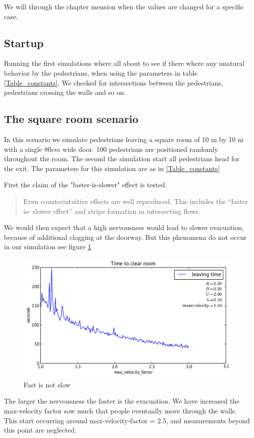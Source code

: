 We will through the chapter mension when the values are changed for a specific case. 

\subsection{Startup}
Running the first simulations where all about to see if there where any unatural behavior 
by the pedestrians, when using the parameters in table \ref{Table_constants}. We checked for intersections between the pedestrians, pedestrians crossing the walls and so on.





\subsection{The square room scenario}
In this scenario we simulate pedestrians leaving a square room of 10 m by 10 m with a single $80cm$ wide door. 100 pedestrians are positioned randomly throughout the room. The second the simulation start all pedestrians head for the exit. The parameters for this simulation are as in \ref{Table_constants}

First the claim of the "faster-is-slower" effect is tested.
\begin{quote}
Even counterintuitive
effects are well reproduced. This includes the “faster is-
slower effect” and stripe formation in intersecting flows. \cite{self-org}
\end{quote}
We would then expect that a high nervousness would lead to slower evacuation, because of additional clogging at the doorway. But this phenomena do not occur in our simulation see figure \ref{FastIsSlow}
\begin{figure}
\centering
\includegraphics[scale=0.5]{Figures/fastIsSlowNot}
\caption{Fast is not slow}
\label{FastIsSlow}
\end{figure}
The larger the nervousness the faster is the evacuation. We have increased the max-velocity factor sow much that people eventually move through the walls. This start occurring around max-velocity-factor = 2.5, and measurements beyond this point are neglected.

